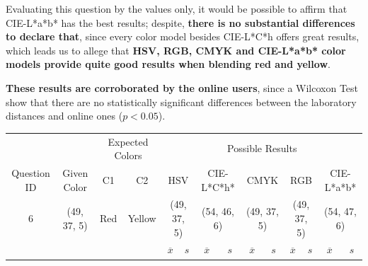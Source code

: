 Evaluating this question by the values only, it would be possible to affirm that CIE-L*a*b* has the best results; despite, \textbf{there is no substantial differences to declare that}, since
every color model besides CIE-L*C*h offers great results, which leads us to allege that \textbf{HSV, RGB, CMYK and CIE-L*a*b* color models provide quite good results when blending red and yellow}. \par
%
\textbf{These results are corroborated by the online users}, since a Wilcoxon Test show that there are no statistically significant differences between the laboratory distances and online ones ($p < 0.05$).
%
\begin{table}[H]
  \resizebox{\textwidth}{!} {
  \begin{tabular}{lccccccccccccc}
    \hline
    \multicolumn{1}{c}{}                              &                                      & \multicolumn{2}{c}{Expected Colors}                   & \multicolumn{10}{c}{Possible Results}                                                                                                                                                                                                                                                                                        \\ \cline{3-14}
    \multicolumn{1}{c}{\multirow{-2}{*}{Question ID}} & \multirow{-2}{*}{Given Color}        & C1                       & C2                         & \multicolumn{2}{c}{HSV}                                        & \multicolumn{2}{c}{CIE-L*C*h*}                                 & \multicolumn{2}{c}{CMYK}                                       & \multicolumn{2}{c}{RGB}                                        & \multicolumn{2}{c}{CIE-L*a*b*}                                 \\ \hline
    \multicolumn{1}{c}{6}                             & \cellcolor[HTML]{FF8000}(49, 37, 5) & \multicolumn{1}{c|}{Red} & \multicolumn{1}{c|}{Yellow}  & \multicolumn{2}{c|}{\cellcolor[HTML]{FF8000}(49, 37, 5)}      & \multicolumn{2}{c|}{\cellcolor[HTML]{FF9F00}(54, 46, 6)}       & \multicolumn{2}{c|}{\cellcolor[HTML]{FF8000}(49, 37, 5)}       & \multicolumn{2}{c|}{\cellcolor[HTML]{FF8000}(49, 37, 5)}       & \multicolumn{2}{c|}{\cellcolor[HTML]{FFA100}(54, 47, 6)}       \\ \hline
                                                      & \multicolumn{1}{l}{}                 & \multicolumn{1}{l}{}     & \multicolumn{1}{l}{}       & \multicolumn{1}{c}{$\overline{x}$} & \multicolumn{1}{c}{$s$} & \multicolumn{1}{c}{$\overline{x}$} & \multicolumn{1}{c}{$s$} & \multicolumn{1}{c}{$\overline{x}$} & \multicolumn{1}{c}{$s$} & \multicolumn{1}{c}{$\overline{x}$} & \multicolumn{1}{c}{$s$} & \multicolumn{1}{c}{$\overline{x}$} & \multicolumn{1}{c}{$s$} \\ \hline

\end{tabular}}
\end{table}
